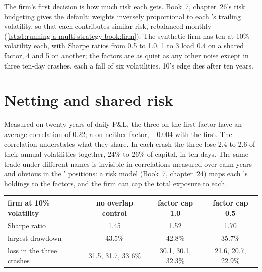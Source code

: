 The firm's first decision is how much risk each  gets. Book~7, chapter~26's risk budgeting gives the default: weights inversely proportional to each
's trailing volatility, so that each contributes similar risk, rebalanced monthly (\cref{lst:s1:running-a-multi-strategy-book:firm}). The synthetic
firm has ten  at 10\% volatility each, with Sharpe ratios from 0.5 to 1.0.  1 to 3 load 0.4 on a shared factor,  4 and 5 on another; the
factors are as quiet as any other noise except in three ten-day crashes, each a fall of six  volatilities.  10's edge dies after ten years.

\section{Netting and shared risk}

Measured on twenty years of daily P\&L, the three  on the first factor have an average correlation of 0.22; a  on neither factor, $-0.004$
with the first. The correlation understates what they share. In each crash the three  lose 2.4 to 2.6 of their annual volatilities together, 24\% to
26\% of capital, in ten days. The same trade under different names is invisible in correlations measured over calm years and obvious in the '
positions: a risk model (Book~7, chapter~24) maps each 's holdings to the factors, and the firm can cap the total exposure to each.

\begin{center}
\small
\begin{tabular}{@{}lccc@{}}
\toprule
firm at 10\% volatility & no overlap control & factor cap 1.0 & factor cap 0.5\\
\midrule
Sharpe ratio & 1.45 & 1.52 & 1.70\\
largest drawdown & 43.5\% & 42.8\% & 35.7\%\\
loss in the three crashes & 31.5, 31.7, 33.6\% & 30.1, 30.1, 32.3\% & 21.6, 20.7, 22.9\%\\
\bottomrule
\end{tabular}
\end{center}


